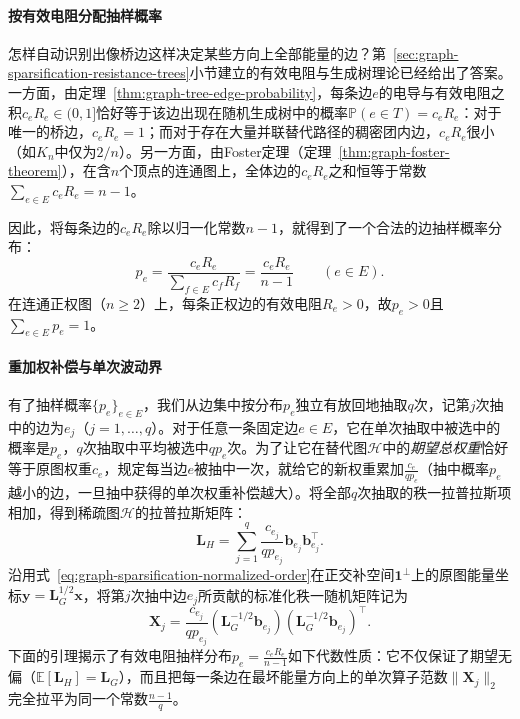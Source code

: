 \paragraph{按有效电阻分配抽样概率}

怎样自动识别出像桥边这样决定某些方向上全部能量的边？第~\ref{sec:graph-sparsification-resistance-trees}小节建立的有效电阻与生成树理论已经给出了答案。一方面，由定理~\ref{thm:graph-tree-edge-probability}，每条边$e$的电导与有效电阻之积$c_e R_e\in(0,1]$恰好等于该边出现在随机生成树中的概率$\mathbb P(e\in T)=c_e R_e$：对于唯一的桥边，$c_e R_e=1$；而对于存在大量并联替代路径的稠密团内边，$c_e R_e$很小（如$K_n$中仅为$2/n$）。另一方面，由Foster定理（定理~\ref{thm:graph-foster-theorem}），在含$n$个顶点的连通图上，全体边的$c_e R_e$之和恒等于常数$\sum_{e\in E}c_e R_e=n-1$。

因此，将每条边的$c_e R_e$除以归一化常数$n-1$，就得到了一个合法的边抽样概率分布：
\begin{equation}
p_e=\frac{c_eR_e}{\sum_{f\in E}c_fR_f}=\frac{c_eR_e}{n-1}\qquad(e\in E).
\label{eq:graph-resistance-sampling-probability}
\end{equation}
在连通正权图（$n\geq 2$）上，每条正权边的有效电阻$R_e>0$，故$p_e>0$且$\sum_{e\in E}p_e=1$。

\paragraph{重加权补偿与单次波动界}

有了抽样概率$\{p_e\}_{e\in E}$，我们从边集中按分布$p_e$独立有放回地抽取$q$次，记第$j$次抽中的边为$e_j$（$j=1,\ldots,q$）。对于任意一条固定边$e\in E$，它在单次抽取中被选中的概率是$p_e$，$q$次抽取中平均被选中$qp_e$次。为了让它在替代图$\mathcal H$中的\emph{期望总权重}恰好等于原图权重$c_e$，规定每当边$e$被抽中一次，就给它的新权重累加$\frac{c_e}{qp_e}$（抽中概率$p_e$越小的边，一旦抽中获得的单次权重补偿越大）。将全部$q$次抽取的秩一拉普拉斯项相加，得到稀疏图$\mathcal H$的拉普拉斯矩阵：
\begin{equation}
\bm L_H
=\sum_{j=1}^q \frac{c_{e_j}}{qp_{e_j}}
     \bm b_{e_j}\bm b_{e_j}^\top.
\label{eq:graph-resistance-sampling-laplacian}
\end{equation}
沿用式~\eqref{eq:graph-sparsification-normalized-order}在正交补空间$\bm 1^\perp$上的原图能量坐标$\bm y=\bm L_G^{1/2}\bm x$，将第$j$次抽中边$e_j$所贡献的标准化秩一随机矩阵记为
\begin{equation}
\bm X_j=\frac{c_{e_j}}{qp_{e_j}}
     (\bm L_G^{-1/2}\bm b_{e_j})
     (\bm L_G^{-1/2}\bm b_{e_j})^\top.
\label{eq:graph-resistance-sampling-standardized}
\end{equation}
下面的引理揭示了有效电阻抽样分布$p_e=\frac{c_e R_e}{n-1}$如下代数性质：它不仅保证了期望无偏（$\mathbb E[\bm L_H]=\bm L_G$），而且把每一条边在最坏能量方向上的单次算子范数$\lVert\bm X_j\rVert_2$完全拉平为同一个常数$\frac{n-1}{q}$。

